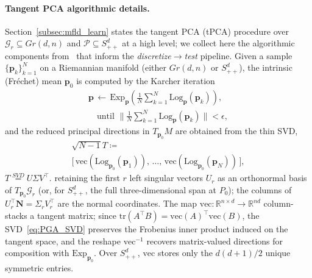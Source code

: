 \documentclass[pdflatex,iicol]{sn-jnl}%
\theoremstyle{thmstyleone}%
\theoremstyle{thmstyletwo}%
\theoremstyle{thmstylethree}%
\begin{document}
\begin{appendices}
\paragraph{Tangent PCA algorithmic details.}
Section~\ref{subsec:mfld_learn} states the tangent PCA (tPCA) procedure over $\mathcal{G}_r \subseteq Gr(d,n)$ and $\mathcal{P}\subseteq S^d_{++}$ at a high level; we collect here the algorithmic components from~\cite{grey2023separable,fletcher2003statistics,fletcher2004principal,edelman1998geometry,bendokat2020grassmann} that inform the \emph{discretize}$\to$\emph{test} pipeline. Given a sample $\lbrace \boldsymbol{p}_k\rbrace_{k=1}^N$ on a Riemannian manifold (either $Gr(d,n)$ or $S^d_{++}$), the intrinsic (Fr\'echet) mean $\boldsymbol{p}_0$ is computed by the Karcher iteration~\cite{pennec1999probabilities}
\begin{multline}\label{eq:Frechet_iter}
    \boldsymbol{p} \,\leftarrow\, \mathrm{Exp}_{\boldsymbol{p}}\!\left(\tfrac{1}{N}\sum_{k=1}^N \mathrm{Log}_{\boldsymbol{p}}(\boldsymbol{p}_k)\right), \\
    \quad \text{until } \Big\|\tfrac{1}{N}\sum_{k=1}^N \mathrm{Log}_{\boldsymbol{p}}(\boldsymbol{p}_k)\Big\| < \epsilon,
\end{multline}
and the reduced principal directions in $T_{\boldsymbol{p}_0}M$ are obtained from the thin SVD,
\begin{multline}\label{eq:PGA_SVD}
    \sqrt{N-1}T \coloneqq \\
    \big[\,\mathrm{vec}(\mathrm{Log}_{\boldsymbol{p}_0}(\boldsymbol{p}_1)),\,\dots,
    \,\mathrm{vec}(\mathrm{Log}_{\boldsymbol{p}_0}(\boldsymbol{p}_N))\,\big],  
\end{multline}
$T\overset{SVD}{=} U\Sigma V^{\top}$. retaining the first $r$ left singular vectors $U_r$ as an orthonormal basis of $T_{\boldsymbol{p}_0}\mathcal{G}_r$ (or, for $S^d_{++}$, the full three-dimensional span at $P_0$); the columns of $ U_r^{\top}\boldsymbol{N} = \Sigma_r V_r^{\top}$ are the normal coordinates. The map $\mathrm{vec}:\mathbb{R}^{n\times d}\to\mathbb{R}^{nd}$ column-stacks a tangent matrix; since $\mathrm{tr}(A^{\top}B)=\mathrm{vec}(A)^{\top}\mathrm{vec}(B)$, the SVD~\eqref{eq:PGA_SVD} preserves the Frobenius inner product induced on the tangent space, and the reshape $\mathrm{vec}^{-1}$ recovers matrix-valued directions for composition with $\mathrm{Exp}_{\boldsymbol{p}_0}$. Over $S^d_{++}$, $\mathrm{vec}$ stores only the $d(d+1)/2$ unique symmetric entries.


\end{appendices}
\end{document}
